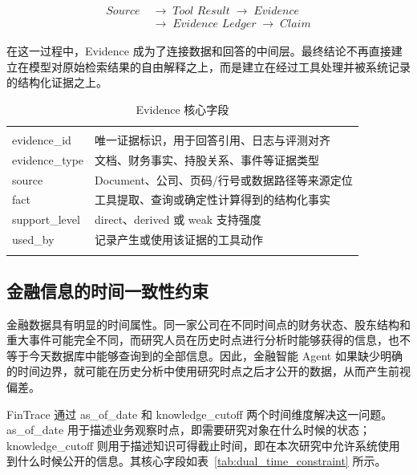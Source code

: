 \[
\begin{aligned}
\textit{Source}
&\;\rightarrow\;
\textit{Tool Result}
\;\rightarrow\;
\textit{Evidence} \\
&\;\rightarrow\;
\textit{Evidence Ledger}
\;\rightarrow\;
\textit{Claim}
\end{aligned}
\]

在这一过程中，Evidence 成为了连接数据和回答的中间层。最终结论不再直接建立在模型对原始检索结果的自由解释之上，而是建立在经过工具处理并被系统记录的结构化证据之上。

\begin{table}[htbp]
  \centering
  \caption{Evidence 核心字段}
  \label{tab:evidence_schema}
  \begin{tabular}{C{.23\textwidth}C{.67\textwidth}}
    \fintracetoprule
     &  \\
    \fintracemidrule
    evidence\_id & 唯一证据标识，用于回答引用、日志与评测对齐 \\
    evidence\_type & 文档、财务事实、持股关系、事件等证据类型 \\
    source & Document、公司、页码/行号或数据路径等来源定位 \\
    fact & 工具提取、查询或确定性计算得到的结构化事实 \\
    support\_level & direct、derived 或 weak 支持强度 \\
    used\_by & 记录产生或使用该证据的工具动作 \\
    \fintracebottomrule
  \end{tabular}
\end{table}

\subsection{金融信息的时间一致性约束}

金融数据具有明显的时间属性。同一家公司在不同时间点的财务状态、股东结构和重大事件可能完全不同，而研究人员在历史时点进行分析时能够获得的信息，也不等于今天数据库中能够查询到的全部信息。因此，金融智能 Agent 如果缺少明确的时间边界，就可能在历史分析中使用研究时点之后才公开的数据，从而产生前视偏差。

FinTrace 通过 as\_of\_date 和 knowledge\_cutoff 两个时间维度解决这一问题。as\_of\_date 用于描述业务观察时点，即需要研究对象在什么时候的状态；knowledge\_cutoff 则用于描述知识可得截止时间，即在本次研究中允许系统使用到什么时候公开的信息。其核心字段如表~\ref{tab:dual_time_constraint} 所示。

